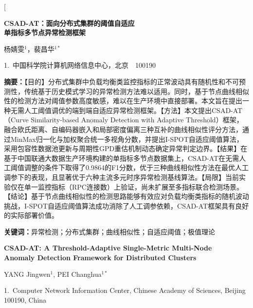 \documentclass[10.5pt,a4paper,twocolumn]{ctexart}
\begin{document}
\twocolumn[
\begin{@twocolumnfalse}
\begin{center}

{\bfseries CSAD-AT：面向分布式集群的阈值自适应\\单指标多节点异常检测框架\par}
\vspace{0.8em}

{ 杨婧雯$^{1}$，裴昌华$^{1*}$\par}
\vspace{0.3em}
{ 1.~中国科学院计算机网络信息中心，北京~~100190\par}
\vspace{1em}

\parbox{0.92\textwidth}{
\textbf{摘\quad 要：}【目的】分布式集群中负载均衡类监控指标的正常波动具有随机性和不可预测性，传统基于历史模式学习的异常检测方法难以适用。同时，基于节点曲线相似性的检测方法对阈值参数高度敏感，难以在生产环境中直接部署。本文旨在提出一种无需人工阈值调优的端到端自适应异常检测框架。【方法】本文提出CSAD-AT（Curve Similarity-based Anomaly Detection with Adaptive Threshold）框架，融合欧氏距离、自编码器嵌入和局部密度偏离三种互补的曲线相似性评分方法，通过MinMax归一化与加权聚合统一多视角分数，并提出I-SPOT自适应阈值算法，采用包容性数据池更新与周期性GPD重估机制动态确定异常判定边界。【结果】在基于中国联通大数据生产环境构建的单指标多节点数据集上，CSAD-AT在无需人工阈值调整的条件下取得了0.9864的F1分数，优于三种曲线相似性方法在最优人工调参下的表现，且显著优于六种主流多元时序异常检测基线算法。【局限】当前实验仅在单一监控指标（RPC连接数）上验证，尚未扩展至多指标联合检测场景。【结论】基于节点曲线相似性的检测思路能够有效应对负载均衡类指标的随机波动挑战，I-SPOT自适应阈值算法成功消除了人工调参依赖，CSAD-AT框架具有良好的实际部署价值。
}
\vspace{0.4em}

\parbox{0.92\textwidth}{
\textbf{关键词：}异常检测；分布式集群；曲线相似性；自适应阈值；极值理论
}
\vspace{1.2em}

{\bfseries CSAD-AT: A Threshold-Adaptive Single-Metric Multi-Node\\ Anomaly Detection Framework for Distributed Clusters\par}
\vspace{0.6em}
{ YANG Jingwen$^{1}$, PEI Changhua$^{1*}$\par}
\vspace{0.3em}
{ 1.~Computer Network Information Center, Chinese Academy of Sciences, Beijing 100190, China\par}
\vspace{0.8em}


\end{center}
\end{@twocolumnfalse}
\end{document}
